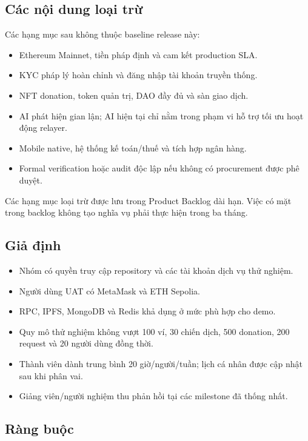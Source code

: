 \subsection{Các nội dung loại trừ}

Các hạng mục sau không thuộc baseline release này:

\begin{itemize}
  \item Ethereum Mainnet, tiền pháp định và cam kết production SLA.
  \item KYC pháp lý hoàn chỉnh và đăng nhập tài khoản truyền thống.
  \item NFT donation, token quản trị, DAO đầy đủ và sàn giao dịch.
  \item AI phát hiện gian lận; AI hiện tại chỉ nằm trong phạm vi hỗ trợ tối ưu hoạt động relayer.
  \item Mobile native, hệ thống kế toán/thuế và tích hợp ngân hàng.
  \item Formal verification hoặc audit độc lập nếu không có procurement được phê duyệt.
\end{itemize}

Các hạng mục loại trừ được lưu trong Product Backlog dài hạn. Việc có mặt trong backlog không tạo nghĩa vụ phải thực hiện trong ba tháng.

\subsection{Giả định}

\begin{itemize}
  \item Nhóm có quyền truy cập repository và các tài khoản dịch vụ thử nghiệm.
  \item Người dùng UAT có MetaMask và ETH Sepolia.
  \item RPC, IPFS, MongoDB và Redis khả dụng ở mức phù hợp cho demo.
  \item Quy mô thử nghiệm không vượt 100 ví, 30 chiến dịch, 500 donation, 200 request và 20 người dùng đồng thời.
  \item Thành viên dành trung bình 20 giờ/người/tuần; lịch cá nhân được cập nhật sau khi phân vai.
  \item Giảng viên/người nghiệm thu phản hồi tại các milestone đã thống nhất.
\end{itemize}

\subsection{Ràng buộc}

